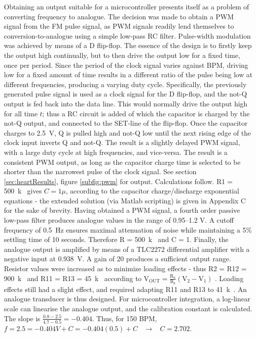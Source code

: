 Obtaining an output suitable for a microcontroller presents itself as a problem of converting frequency to analogue. The decision was made to obtain a PWM signal from the FM pulse signal, as PWM signals readily lend themselves to conversion-to-analogue using a simple low-pass RC filter. Pulse-width modulation was achieved by means of a D flip-flop. The essence of the design is to firstly keep the output high continually, but to then drive the output low for a fixed time, once per period. Since the period of the clock signal varies against BPM, driving low for a fixed amount of time results in a different ratio of the pulse being low at different frequencies, producing a varying duty cycle. Specifically, the previously generated pulse signal is used as a clock signal for the D flip-flop, and the not-Q output is fed back into the data line. This would normally drive the output high for all time $t$; thus a RC circuit is added of which the capacitor is charged by the not-Q output, and connected to the SET-line of the flip-flop. Once the capacitor charges to \SI{2.5}{V}, Q is pulled high and not-Q low until the next rising edge of the clock input inverts Q and not-Q. The result is a slightly delayed PWM signal, with a large duty cycle at high frequencies, and vice-versa. The result is a consistent PWM output, as long as the capacitor charge time is selected to be shorter than the narrowest pulse of the clock signal. See section \ref{sec:heartResults}, figure \ref{subfig:pwm} for output. Calculations follow. R1 = \SI{500}{k\Omega} gives $C = 1\mu$, according to the capacitor charge/discharge exponential equations - the extended solution (via Matlab scripting) is given in Appendix C for the sake of brevity. Having obtained a PWM signal, a fourth order passive low-pass filter produces analogue values in the range of \numrange{0.95}{1.2} \si{V}. A cutoff frequency of \SI{0.5}{Hz} ensures maximal attenuation of noise while maintaining a 5\% settling time of 10 seconds. Therefore R = \SI{500}{k\Omega} and C = \SI{1}{\mu}. Finally, the analogue output is amplified by means of a TLC2272 differential amplifier with a negative input at \SI{0.938}{V}. A gain of 20 produces a sufficient output range. Resistor values were increased as to minimize loading effects - thus R2 = R12 = \SI{900}{k\Omega} and R11 = R13 = \SI{45}{k\Omega} according to $\mathrm{V}_{\mathrm{OUT}}=\frac{\mathrm{R}_{a}}{\mathrm{R}_{b}}\left(\mathrm{V}_{2}-\mathrm{V}_{1}\right)$ \cite{opamp}. Loading effects still had a slight effect, and required adapting R11 and R13 to \SI{41}{k\Omega}. An analogue transducer is thus designed. For microcontroller integration, a log-linear scale can linearise the analogue output, and the calibration constant is calculated. The slope is $\frac{0.8-2.5}{4.7-0.5} = -0.404$. Thus, for 150 BPM, $f = 2.5 = -0.404V + C = -0.404(0.5) + C \;\;\; \rightarrow \;\;\; C = 2.702$.\\
